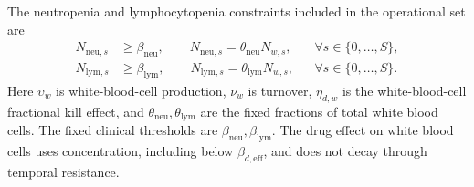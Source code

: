 \documentclass{article}
\begin{document}
The neutropenia and lymphocytopenia constraints included in the operational set are
\begin{align*}
N_{\mathrm{neu},s}&\geq\beta_{\mathrm{neu}},\qquad
N_{\mathrm{neu},s}=\theta_{\mathrm{neu}}N_{w,s},
&&\forall s\in\{0,\ldots,S\},\\
N_{\mathrm{lym},s}&\geq\beta_{\mathrm{lym}},\qquad
N_{\mathrm{lym},s}=\theta_{\mathrm{lym}}N_{w,s},
&&\forall s\in\{0,\ldots,S\}.
\end{align*}
Here $\upsilon_w$ is white-blood-cell production, $\nu_w$ is turnover, $\eta_{d,w}$ is the white-blood-cell fractional kill effect, and $\theta_{\mathrm{neu}},\theta_{\mathrm{lym}}$ are the fixed fractions of total white blood cells. The fixed clinical thresholds are $\beta_{\mathrm{neu}},\beta_{\mathrm{lym}}$. The drug effect on white blood cells uses concentration, including below $\beta_{d,\mathrm{eff}}$, and does not decay through temporal resistance.
\end{document}
